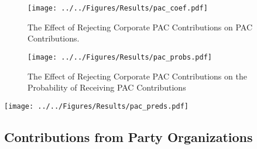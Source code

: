 \documentclass[12pt]{article}
\begin{document}
\begin{figure*}[h]
    \centering
    \begin{subfigure}[b]{0.75\textwidth}
        \centering
        \texttt{[image: ../../Figures/Results/pac\_coef.pdf]}
        \caption{The Effect of Rejecting Corporate PAC Contributions on PAC Contributions.}
        \label{fig: pac coefs}
    \end{subfigure}
    
    \begin{subfigure}[b]{0.75\textwidth}
        \centering
        \texttt{[image: ../../Figures/Results/pac\_probs.pdf]}
        \caption{The Effect of Rejecting Corporate PAC Contributions on the Probability of Receiving PAC Contributions}
        \label{fig: pac probs}
    \end{subfigure}
    \caption{\textbf{The Effect of Rejecting Corporate PAC Contributions on PAC Contributions and the Probability of Receiving Money from PACs.} These figures present the posterior distributions estimated for a candidate that pledges to reject corporate PAC contributions. The dot shows the median coefficient estimate and the intervals show the 50\% and 89\% highest density intervals. Figure \ref{fig: pac coefs} shows that candidates that pledge to reject corporate PAC contributions experience a reduction in contributions from all types of PACs. Figure \ref{fig: pac probs} shows that rejecting corporate PAC contributions increases the probability of not receiving contributions from business PACs. See Table \ref{tbl: pac results} for the formal estimates.}
    \label{fig: pac results}
\end{figure*}

\begin{figure*}[h]
	\centering
	\texttt{[image: ../../Figures/Results/pac\_preds.pdf]}
\end{figure*}


\subsection{Contributions from Party Organizations}
\end{document}
